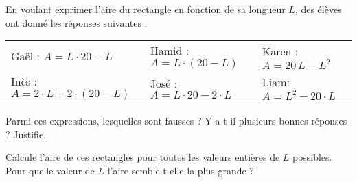 \begin{activite}
\begin{partie}
En voulant exprimer l'aire du rectangle en fonction de sa longueur $L$, des élèves ont donné les réponses suivantes :
\begin{center}
 \begin{tabularx}{1.1\linewidth}{X|X|X}
  Gaël : $A = L \cdot 20 - L$ & Hamid : $A = L \cdot (20 - L)$ & Karen : $A = 20\,L - L^2$ \\
  Inès : $A = 2 \cdot L + 2 \cdot (20 - L)$ & José : $A = L \cdot 20 - 2 \cdot L$ & Liam: $A = L^2 - 20 \cdot L$ \\
  \end{tabularx}   
 \end{center}
 \vspace{0.3cm}
Parmi ces expressions, lesquelles sont fausses ? Y a-t-il plusieurs bonnes réponses ? Justifie.
\end{partie}

\begin{partie}
Calcule l'aire de ces rectangles pour toutes les valeurs entières de $L$ possibles. Pour quelle valeur de $L$ l'aire semble-t-elle la plus grande ?
\end{partie}

\end{activite}
